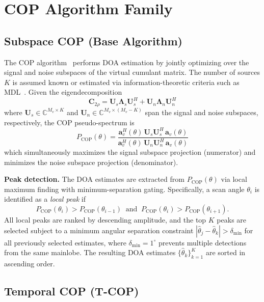 \documentclass[journal]{IEEEtran}
\newcommand{\mat}[1]{\mathbf{#1}}
\newcommand{\C}{\mathbb{C}}
\begin{document}
\section{COP Algorithm Family}
\label{sec:cop}

\subsection{Subspace COP (Base Algorithm)}

The COP algorithm~\cite{choi2015underdetermined} performs DOA estimation by jointly optimizing over the signal and noise subspaces of the virtual cumulant matrix. The number of sources $K$ is assumed known or estimated via information-theoretic criteria such as MDL~\cite{wax1985mdl}. Given the eigendecomposition
\begin{equation}
\mat{C}_{2\rho} = \mat{U}_s \mat{\Lambda}_s \mat{U}_s^H + \mat{U}_n \mat{\Lambda}_n \mat{U}_n^H
\end{equation}
where $\mat{U}_s \in \C^{M_v \times K}$ and $\mat{U}_n \in \C^{M_v \times (M_v - K)}$ span the signal and noise subspaces, respectively, the COP pseudo-spectrum is
\begin{equation}
P_{\mathrm{COP}}(\theta) = \frac{\mat{a}_v^H(\theta)\,\mat{U}_s\mat{U}_s^H\,\mat{a}_v(\theta)}{\mat{a}_v^H(\theta)\,\mat{U}_n\mat{U}_n^H\,\mat{a}_v(\theta)}
\label{eq:cop_spectrum}
\end{equation}
which simultaneously maximizes the signal subspace projection (numerator) and minimizes the noise subspace projection (denominator).

\textbf{Peak detection.}
The DOA estimates are extracted from $P_{\mathrm{COP}}(\theta)$ via local maximum finding with minimum-separation gating. Specifically, a scan angle $\theta_i$ is identified as a \emph{local peak} if
\begin{equation}
P_{\mathrm{COP}}(\theta_i) > P_{\mathrm{COP}}(\theta_{i-1}) \;\;\text{and}\;\; P_{\mathrm{COP}}(\theta_i) > P_{\mathrm{COP}}(\theta_{i+1}).
\label{eq:local_peak}
\end{equation}
All local peaks are ranked by descending amplitude, and the top $K$ peaks are selected subject to a minimum angular separation constraint $|\hat{\theta}_j - \hat{\theta}_k| > \delta_{\min}$ for all previously selected estimates, where $\delta_{\min} = 1^\circ$ prevents multiple detections from the same mainlobe. The resulting DOA estimates $\{\hat{\theta}_k\}_{k=1}^K$ are sorted in ascending order.

\subsection{Temporal COP (T-COP)}
\label{sec:tcop}
\end{document}
